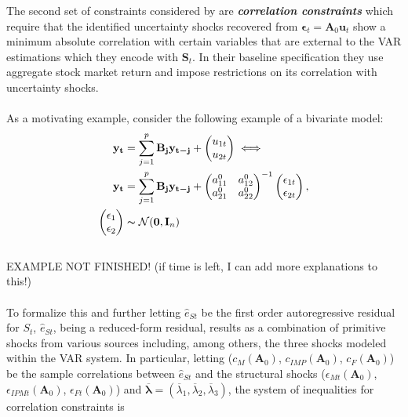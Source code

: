 \documentclass[a4paper,11pt,listof=nochaptergap,oneside,pointednumbers,bibtotoc,bigheadings,liststotoc]{scrbook}
\theoremstyle{mysatz}
\theoremstyle{mydefinition}
\theoremstyle{mybemerkung}
\newcommand{\vect}[1]{\boldsymbol{\mathbf{#1}}}
\begin{document}
The second set of constraints considered by \citet{ludvigsonetal:18} are \textbf{\textit{correlation constraints}} which require that the identified uncertainty shocks recovered from $\vect{\epsilon}_t = \vect{A}_0\vect{u}_t$ show a minimum absolute correlation with certain variables that are external to the VAR estimations which they encode with $\vect{S}_t$. In their baseline specification they use aggregate stock market return and impose restrictions on its correlation with uncertainty shocks. \\
\\
As a motivating example, \citet{ludvigsonetal:17} consider the following example of a bivariate model:
\begin{equation} \label{eq:svar_ludvi12_a}
\begin{split}
	\vect{y_t} & = \sum_{j=1}^{p} \vect{B_j}\vect{y_{t-j}} + 
		\begin{pmatrix}
			u_{1t} \\
			u_{2t}
		\end{pmatrix} \iff \\
\vect{y_t} & = \sum_{j=1}^{p} \vect{B_j}\vect{y_{t-j}} + 	
					\begin{pmatrix}
    			a_{11}^0 &  a_{12}^0 \\
			a_{21}^0 &  a_{22}^0
 			\end{pmatrix}^{-1}
		\begin{pmatrix}
			\epsilon_{1t} \\
			\epsilon_{2t}
		\end{pmatrix},\\
		\begin{pmatrix}
			\epsilon_1 \\
			\epsilon_2
		\end{pmatrix} & \thicksim \mathcal{N}(\vect{0}, \vect{I}_n)
\end{split}								
\end{equation}
\\
EXAMPLE NOT FINISHED! (if time is left, I can add more explanations to this!)
\\
\\
To formalize this and further letting $\hat{e}_{St}$ be the first order autoregressive residual for $S_t$, $\hat{e}_{St}$, being a reduced-form residual, results as a combination of primitive shocks from various sources including, among others, the three shocks modeled within the VAR system. In particular, letting ($c_M(\vect{A}_0)$, $c_{IMP}(\vect{A}_0)$, $c_{F}(\vect{A}_0)$) be the sample correlations between $\hat{e}_{St}$ and the structural shocks ($\epsilon_{Mt}(\vect{A}_0)$, $\epsilon_{IPMt}(\vect{A}_0)$, $\epsilon_{Ft}(\vect{A}_0)$) and $\overline{\vect{\lambda}} = (\overline{\lambda}_1, \overline{\lambda}_2, \overline{\lambda}_3)$, the system of inequalities for correlation constraints is
\end{document}

